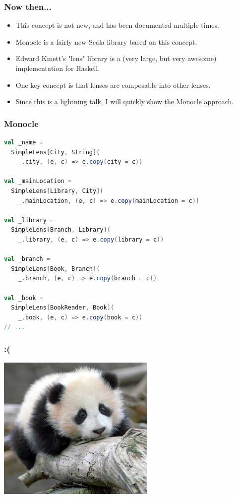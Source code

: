 \documentclass{beamer}
\begin{document}
\begin{frame}[fragile]
  \frametitle{Now then...}
  \begin{itemize}
    \item This concept is not new, and has been documented multiple times.
    \item Monocle is a fairly new Scala library based on this concept.
    \item Edward Kmett's "lens" library is a (very large, but very awesome) implementation for Haskell.
    \item One key concept is that lenses are composable into other lenses.
    \item Since this is a lightning talk, I will quickly show the Monocle approach.
  \end{itemize}
\end{frame}

\begin{frame}[fragile]
  \frametitle{Monocle}
  \begin{lstlisting}[language=scala]
val _name =
  SimpleLens[City, String](
    _.city, (e, c) => e.copy(city = c))

val _mainLocation =
  SimpleLens[Library, City](
    _.mainLocation, (e, c) => e.copy(mainLocation = c))

val _library =
  SimpleLens[Branch, Library](
    _.library, (e, c) => e.copy(library = c))

val _branch =
  SimpleLens[Book, Branch](
    _.branch, (e, c) => e.copy(branch = c))

val _book =
  SimpleLens[BookReader, Book](
    _.book, (e, c) => e.copy(book = c))
// ...
  \end{lstlisting}
\end{frame}

\begin{frame}[fragile]
  \frametitle{:(}
  \begin{center}
    \includegraphics[height=7cm]{img/sadpanda.jpg}
  \end{center}
\end{frame}
\end{document}
